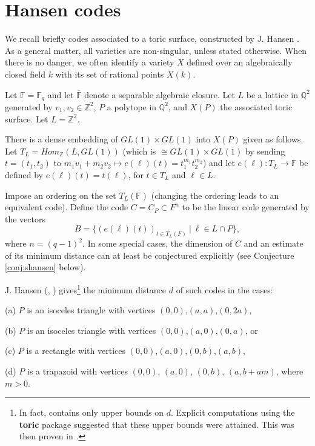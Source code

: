 \documentclass[12pt]{article}
\def\fff{\mathbb{F}}
\def\qqq{\mathbb{Q}}
\def\zzz{\mathbb{Z}}
\begin{document}
\section{Hansen codes}
\label{sec:hansen}

We recall briefly codes associated to a toric surface,
constructed by J. Hansen \cite{H}.
As a general matter, all varieties are non-singular, unless
stated otherwise. When there is no danger, we often identify
a variety $X$ defined over an algebraically closed field
$k$ with its set of rational points $X(k)$.

Let $\fff=\fff_q$ and let 
$\overline{\fff}$ denote a separable algebraic closure. 
Let $L$ be a lattice in $\qqq^2$ generated by $v_1, v_2\in \zzz^2$,
$P$ a polytope in $\qqq^2$,
and $X(P)$ the associated toric surface. Let $L=\zzz^2$.

There is a dense embedding of $GL(1)\times GL(1)$ into $X(P)$
given as follows.
Let $T_L=Hom_{\zzz}(L,GL(1))$ (which is $\cong GL(1)\times GL(1)$
by sending $t=(t_1,t_2)$ to $m_1v_1+m_2v_2\longmapsto
e(\ell)(t)=t_1^{m_1}t_2^{m_2}$)
and let $e(\ell):T_L\rightarrow \overline{\fff}$
be defined by $e(\ell)(t)=t(\ell)$, for $t\in T_L$ and
$\ell\in L$.

Impose an ordering on the set $T_L(\fff )$ (changing the ordering
leads to an equivalent code).
Define the code $C=C_P\subset F^n$ to be the linear code generated
by the vectors
\begin{equation}
\label{eqn:code}
B=\{(e(\ell)(t))_{t\in T_L(F)}\ |\ \ell \in L\cap P\},
\end{equation}
where $n=(q-1)^2$. In some special cases, the dimension of $C$ 
and an estimate of its minimum distance can at least be 
conjectured explicitly (see Conjecture \ref{conj:shansen} below).

J. Hansen (\cite{H}, \cite{H3})
gives\footnote{In fact, \cite{H} contains only upper bounds on $d$. 
Explicit computations using the {\bf toric} package suggested
that these upper bounds were attained. This was then proven
in \cite{H3}.} 
the minimum distance $d$ of 
such codes in the cases:

(a) $P$ is an isoceles triangle with vertices $(0,0)$,$(a,a)$,$(0,2a)$,

(b) $P$ is an isoceles triangle with vertices $(0,0)$,$(a,0)$,$(0,a)$, or

(c) $P$ is a rectangle with vertices $(0,0)$,$(a,0)$,$(0,b)$,$(a,b)$,

(d) $P$ is a trapazoid with vertices $(0,0)$, $(a,0)$, $(0,b)$, $(a,b+am)$,
where $m>0$.
\end{document}
